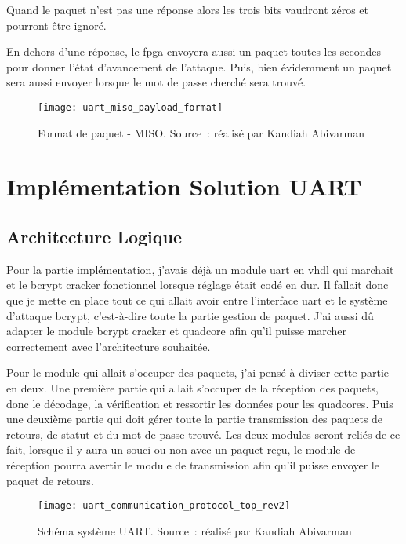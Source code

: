 Quand le paquet n'est pas une réponse alors les trois bits vaudront zéros et pourront être ignoré. 

\newpage

En dehors d'une réponse, le \gls{fpga} envoyera aussi un paquet toutes les secondes pour donner l'état d'avancement de l'attaque.
Puis, bien évidemment un paquet sera aussi envoyer lorsque le mot de passe cherché sera trouvé.

\begin{figure}[tbph!]
	\centering
	\texttt{[image: uart\_miso\_payload\_format]}
	\caption[Format de paquet - MISO]{Format de paquet - MISO. Source : réalisé par Kandiah Abivarman}
	\label{fig:uart_miso_payload_format}
\end{figure}

\newpage

\section{Implémentation Solution UART}

\subsection{Architecture Logique}

Pour la partie implémentation, j’avais déjà un module \gls{uart} en \gls{vhdl} qui marchait et le bcrypt cracker fonctionnel lorsque réglage était codé en dur. 
Il fallait donc que je mette en place tout ce qui allait avoir entre l’interface \gls{uart} et le système d’attaque bcrypt, c’est-à-dire toute la partie gestion de paquet. 
J’ai aussi dû adapter le module bcrypt cracker et quadcore afin qu’il puisse marcher correctement avec l’architecture souhaitée.

Pour le module qui allait s’occuper des paquets, j’ai pensé à diviser cette partie en deux. 
Une première partie qui allait s’occuper de la réception des paquets, donc le décodage, la vérification et ressortir les données pour les quadcores. 
Puis une deuxième partie qui doit gérer toute la partie transmission des paquets de retours, de statut et du mot de passe trouvé. 
Les deux modules seront reliés de ce fait, lorsque il y aura un souci ou non avec un paquet reçu, le module de réception pourra avertir le module de transmission afin qu’il puisse envoyer le paquet de retours.

\begin{figure}[tbph!]
	\centering
	\texttt{[image: uart\_communication\_protocol\_top\_rev2]}
	\caption[Schéma système UART - FPGA]{Schéma système UART. Source : réalisé par Kandiah Abivarman}
	\label{fig:uart_top_schematics}
\end{figure}


